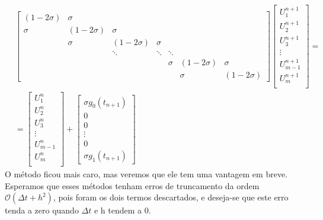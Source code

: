 \documentclass[../differential_methods.tex]{subfiles}
\begin{document}
\begin{align*}
	 & \begin{bmatrix}
		   (1-2\sigma ) & \sigma       &              &        &        &              &              \\
		   \sigma       & (1-2\sigma ) & \sigma       &        &        &              &              \\
		                & \sigma       & (1-2\sigma ) & \sigma &        &              &              \\
		                &              & \ddots       & \ddots & \ddots &              &              \\
		                &              &              &        & \sigma & (1-2\sigma ) & \sigma       \\
		                &              &              &        &        & \sigma       & (1-2\sigma )
	   \end{bmatrix}\begin{bmatrix}
		                U_{1}^{n+1}   \\
		                U_{2}^{n+1}   \\
		                U_{3}^{n+1}   \\
		                \vdots        \\
		                U_{m-1}^{n+1} \\
		                U_{m}^{n+1}   \\
	                \end{bmatrix} = \\
	 & =\begin{bmatrix}
		    U_{1}^{n}   \\
		    U_{2}^{n}   \\
		    U_{3}^{n}   \\
		    \vdots      \\
		    U_{m-1}^{n} \\
		    U_{m}^{n}   \\
	    \end{bmatrix} + \begin{bmatrix}
		                    \sigma  g_{0}(t_{n+1}) \\
		                    0                      \\
		                    0                      \\
		                    \vdots                 \\
		                    0                      \\
		                    \sigma g_1(t_{n+1})
	                    \end{bmatrix}
\end{align*}
O método ficou mais caro, mas veremos que ele tem uma vantagem em breve. Esperamos que esses métodos tenham erros de truncamento da ordem \(\mathcal{O}(\Delta t + h^{2})\), pois foram os dois termos descartados, e deseja-se que este erro tenda a zero quando \(\Delta t\) e h tendem a 0.
\end{document}
